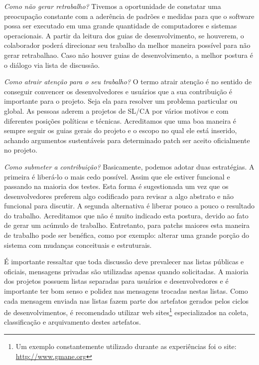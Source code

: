 \textit{Como não gerar retrabalho?} Tivemos a oportunidade de constatar uma preocupação constante com a aderência de padrões e medidas para que o software possa ser executado em uma grande quantidade de computadores e sistemas operacionais. A partir da leitura dos guias de desenvolvimento, se houverem, o colaborador poderá direcionar seu trabalho da melhor maneira possível para não gerar retrabalhao. Caso não houver guias de desenvolvimento, a melhor postura é o diálogo via lista de discussão.

\textit{Como atrair atenção para o seu trabalho?} O termo atrair atenção é no sentido de conseguir convencer os desenvolvedores e usuários que a sua contribuição é importante para o projeto. Seja ela para resolver um problema particular ou global. As pessoas aderem a projetos de SL/CA por vários motivos e com diferentes posições políticas e técnicas. Acreditamos que uma boa maneira é sempre seguir os guias gerais do projeto e o escopo no qual ele está inserido, achando argumentos sustentáveis para determinado patch ser aceito oficialmente no projeto.

\textit{Como submeter a contribuição?} Basicamente, podemos adotar duas estratégias. A primeira é liberá-lo o mais cedo possível. Assim que ele estiver funcional e passando na maioria dos testes. Esta forma é sugestionada um vez que os desenvolvedores preferem algo codificado para revisar a algo abstrato e não funcional para discutir. A segunda alternativa é liberar pouco a pouco o resultado do trabalho. Acreditamos que não é muito indicado esta postura, devido ao fato de gerar um acúmulo de trabalho. Entretanto, para patchs maiores esta maneira de trabalho pode ser benéfica, como por exemplo: alterar uma grande porção do sistema com mudanças conceituais e estruturais. 

É importante ressaltar que toda discussão deve prevalecer nas listas públicas e oficiais, mensagens privadas são utilizadas apenas quando solicitadas. A maioria dos projetos possuem listas separadas para usuários e desenvolvedores e é importante ter bom senso e polidez nas mensagens trocadas nestas listas. Como cada mensagem enviada nas listas fazem parte dos artefatos gerados pelos ciclos de desenvolvimentos, é recomendado utilizar web sites\footnote{Um exemplo constantemente utilizado durante as experiências foi o site: \url{http://www.gmane.org}} especializados na coleta, classificação e arquivamento destes artefatos.

% 
% 

